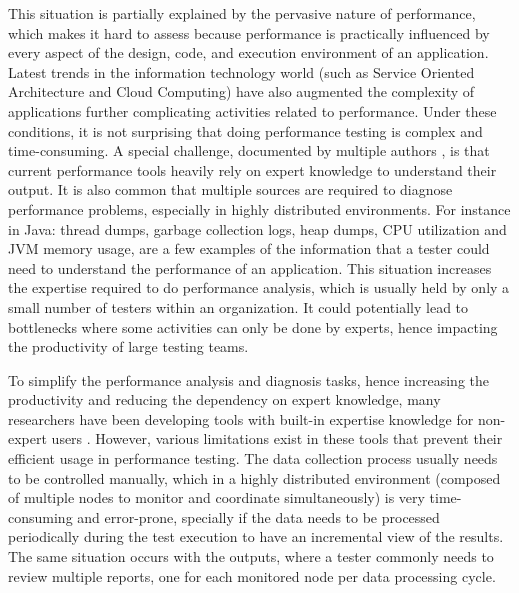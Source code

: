 \documentclass[runningheads,a4paper]{llncs}
\begin{document}
This situation is partially explained by the pervasive nature of
performance, which makes it hard to assess because performance is practically
influenced by every aspect of the design, code, and execution environment
of an application. Latest trends in the information technology world (such as
Service Oriented Architecture and Cloud Computing) have also augmented the
complexity of applications further complicating activities related to
performance. Under these conditions, it is not surprising that doing performance
testing is complex and time-consuming. A special challenge, documented by
multiple authors \cite{Woodside2007,trevor1,Angelopoulos2012}, is that current
performance tools heavily rely on expert knowledge to understand their output.
It is also common that multiple sources are required to diagnose
performance problems, especially in highly distributed environments. For
instance in Java: thread dumps, garbage collection logs, heap dumps, CPU
utilization and JVM memory usage, are a few examples of the information that a
tester could need to understand the performance of an application. This
situation increases the expertise required to do performance analysis, which is
usually held by only a small number of testers within an organization. It
could potentially lead to bottlenecks where some activities can only be done by
experts, hence impacting the productivity of large testing teams.

To simplify the performance analysis and diagnosis tasks, hence increasing the
productivity and reducing the dependency on expert knowledge, many researchers
have been developing tools with built-in expertise knowledge for non-expert
users \cite{Altman2010,pat7,Angelopoulos2012a}. However, various limitations exist in these 
tools that prevent their efficient usage in performance testing. The data collection process 
usually needs to be controlled manually, which in a highly distributed
environment (composed of multiple nodes to monitor and coordinate simultaneously) is very 
time-consuming and error-prone, specially if the data needs to be processed periodically 
during the test execution to have an incremental view of the results. The same
situation occurs with the outputs, where a tester commonly needs to review multiple
reports, one for each monitored node per data processing cycle. 
\end{document}
